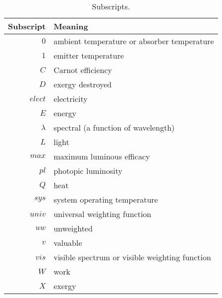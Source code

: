 \begin{table}
\centering
\caption{Subscripts.}
\begin{tabular}{r l}
\toprule
Subscript & Meaning \\
\midrule
$0$ & ambient temperature or absorber temperature \\
$1$ & emitter temperature \\
$C$ & Carnot efficiency \\
$D$ & exergy destroyed \\
$elect$ & electricity \\
$E$ & energy \\
$\lambda$ & spectral (a function of wavelength) \\
$L$ & light \\
$max$ & maximum luminous efficacy \\
$pl$ & photopic luminosity \\
$Q$ & heat \\
$sys$ & system operating temperature \\
$univ$ & universal weighting function \\
$uw$ & unweighted \\
$v$ & valuable \\
$vis$ & visible spectrum or visible weighting function \\
$W$ & work \\
$X$ & exergy \\
\bottomrule
\end{tabular}
\label{tab:subscripts}
\end{table}



